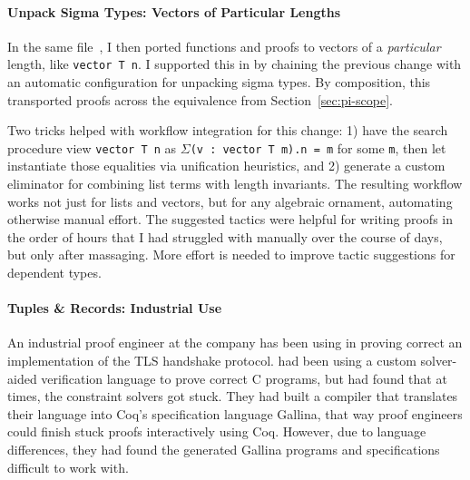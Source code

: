 \paragraph{Unpack Sigma Types: Vectors of Particular Lengths}
In the same file~\href{https://github.com/uwplse/pumpkin-pi/blob/v2.0.0/plugin/coq/examples/Example.v}{}, I then ported functions and proofs to 
vectors of a \textit{particular} length, like \lstinline{vector T n}.
I supported this in \toolnamec by chaining the previous change
with an automatic configuration for unpacking sigma types.
By composition, this transported proofs across the equivalence from Section~\ref{sec:pi-scope}.

Two tricks helped with workflow integration for this change:
1) have the search procedure view \lstinline{vector T n} as 
$\Sigma$\lstinline{(v : vector T m).n = m} for some \lstinline{m},
then let \toolnamec instantiate those equalities via unification heuristics, %
and 2) generate a custom eliminator for combining
list terms with length invariants.
The resulting workflow works not just for lists and vectors, but for any algebraic ornament,
automating otherwise manual effort.
The suggested tactics were helpful for writing proofs in the order of hours
that I had struggled with manually over the course of days, but only after massaging.
More effort is needed to improve tactic suggestions for dependent types.

\paragraph{Tuples \& Records: Industrial Use}
An industrial proof engineer at the company \company has been using \toolnamec in proving
correct an implementation of the TLS handshake protocol.
\company had been using a custom solver-aided verification language to prove correct C programs,
but had found that at times, the constraint solvers got stuck.
They had built a compiler that translates their language into Coq's specification language Gallina,
that way proof engineers could finish stuck proofs interactively using Coq.
However, due to language differences, they had found the generated Gallina programs and specifications difficult to work with.

